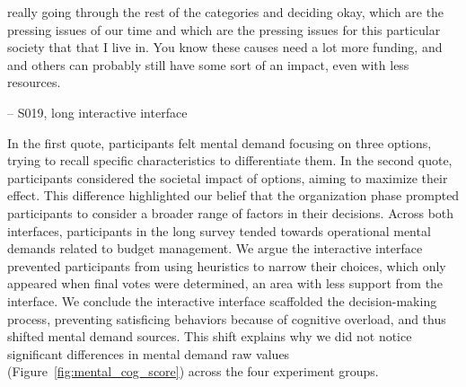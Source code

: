 \begin{displayquote}
\bracketellipsis really going through the rest of the categories and deciding okay, which are the pressing issues of our time and which are the pressing issues for this particular society that that I live in. \bracketellipsis You know these causes need a lot more funding, and and others can probably still have some sort of an impact, even with less resources.

\noindent \hfill -- S019, long interactive interface
\end{displayquote}

In the first quote, participants felt mental demand focusing on three options, trying to recall specific characteristics to differentiate them. In the second quote, participants considered the societal impact of options, aiming to maximize their effect. This difference highlighted our belief that the organization phase prompted participants to consider a broader range of factors in their decisions. Across both interfaces, participants in the long survey tended towards operational mental demands related to budget management. We argue the interactive interface prevented participants from using heuristics to narrow their choices, which only appeared when final votes were determined, an area with less support from the interface. We conclude the interactive interface scaffolded the decision-making process, preventing satisficing behaviors because of cognitive overload, and thus shifted mental demand sources. This shift explains why we did not notice significant differences in mental demand raw values (Figure~\ref{fig:mental_cog_score}) across the four experiment groups.






